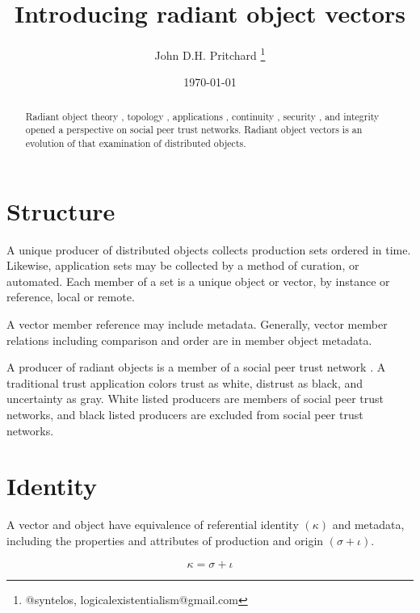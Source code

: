 \documentclass[12pt,twocolumn]{article}
\begin{document}
\title{Introducing radiant object vectors}

\author{John D.H. Pritchard \thanks{@syntelos, logicalexistentialism@gmail.com}}

\date{\today}

\maketitle


\begin{abstract}

Radiant object theory \cite{ROTI}, topology \cite{ROTY}, applications
\cite{ROTA}, continuity \cite{ROTC}, security \cite{ROTS}, and
integrity \cite{ROTN} opened a perspective on social peer trust
networks.  Radiant object vectors is an evolution of that examination
of distributed objects.  
  
\end{abstract}


\section{Structure}

A unique producer of distributed objects collects production sets
ordered in time.  Likewise, application sets may be collected by a
method of curation, or automated.  Each member of a set is a unique
object or vector, by instance or reference, local or remote.

A vector member reference may include metadata.  Generally, vector
member relations including comparison and order are in member object
metadata.

A producer of radiant objects is a member of a social peer trust
network \cite{ROTI}.  A traditional trust application \cite{ROTA,ROTN}
colors trust as white, distrust as black, and uncertainty as gray.
White listed producers are members of social peer trust networks, and
black listed producers are excluded from social peer trust networks.

\section{Identity}

A vector and object have equivalence of referential identity
\((\kappa)\) and metadata, including the properties and attributes of
production and origin \((\sigma + \iota)\).

$$
  {\kappa} = {\sigma} + {\iota}
$$
\end{document}
